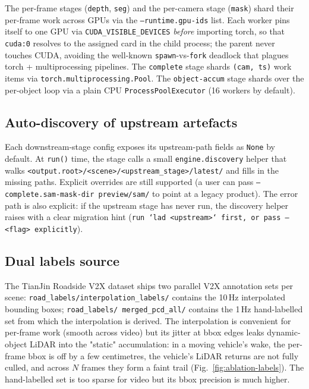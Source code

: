 \documentclass[10pt,twocolumn,letterpaper]{article}
\begin{document}
The per-frame stages (\texttt{depth}, \texttt{seg}) and the per-camera
stage (\texttt{mask}) shard their per-frame work across GPUs via the
\texttt{--runtime.gpu-ids} list. Each worker pins itself to one GPU
via \texttt{CUDA\_VISIBLE\_DEVICES} \emph{before} importing torch, so
that \texttt{cuda:0} resolves to the assigned card in the child
process; the parent never touches CUDA, avoiding the well-known
\texttt{spawn}-vs-\texttt{fork} deadlock that plagues
torch + multiprocessing pipelines. The \texttt{complete} stage shards
\texttt{(cam, ts)} work items via \texttt{torch.multiprocessing.Pool}.
The \texttt{object-accum} stage shards over the per-object loop via a
plain CPU \texttt{ProcessPoolExecutor} (16 workers by default).


\subsection{Auto-discovery of upstream artefacts}
\label{sec:impl-discovery}

Each downstream-stage config exposes its upstream-path fields as
\texttt{None} by default. At \texttt{run()} time, the stage calls a
small \texttt{engine.discovery} helper that walks
\texttt{<output.root>/<scene>/<upstream\_stage>/latest/} and fills in
the missing paths. Explicit overrides are still supported (a user
can pass \texttt{--complete.sam-mask-dir preview/sam/} to point at a
legacy product). The error path is also explicit: if the upstream
stage has never run, the discovery helper raises with a clear
migration hint (\texttt{run `lad <upstream>` first, or pass
--<flag> explicitly}).


\subsection{Dual labels source}
\label{sec:impl-dual}

The TianJin Roadside V2X dataset ships two parallel V2X annotation
sets per scene: \texttt{road\_labels/interpolation\_labels/} contains
the 10\,Hz interpolated bounding boxes; \texttt{road\_labels/
merged\_pcd\_all/} contains the 1\,Hz hand-labelled set from which the
interpolation is derived. The interpolation is convenient for
per-frame work (smooth across video) but its jitter at bbox edges
leaks dynamic-object LiDAR into the "static" accumulation: in a
moving vehicle's wake, the per-frame bbox is off by a few centimetres,
the vehicle's LiDAR returns are not fully culled, and across $N$
frames they form a faint trail (Fig.~\ref{fig:ablation-labels}). The
hand-labelled set is too sparse for video but its bbox precision is
much higher.
\end{document}
